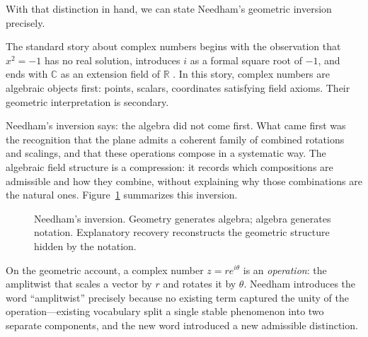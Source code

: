 \documentclass[12pt]{article}
\begin{document}
With that distinction in hand, we can state Needham's geometric inversion precisely.

The standard story about complex numbers begins with the observation that $x^2 = -1$ has no real solution, introduces $i$ as a formal square root of $-1$, and ends with $\mathbb{C}$ as an extension field of $\mathbb{R}$ \cite{Gauss,Argand,Wessel}. In this story, complex numbers are algebraic objects first: points, scalars, coordinates satisfying field axioms. Their geometric interpretation is secondary.

Needham's inversion says: the algebra did not come first. What came first was the recognition that the plane admits a coherent family of combined rotations and scalings, and that these operations compose in a systematic way. The algebraic field structure is a compression: it records which compositions are admissible and how they combine, without explaining why those combinations are the natural ones. Figure~\ref{fig:needham-inversion} summarizes this inversion.

\begin{figure}[ht]
\centering
{}
\caption{Needham's inversion. Geometry generates algebra; algebra generates
notation. Explanatory recovery reconstructs the geometric structure hidden by
the notation.}
\label{fig:needham-inversion}
\end{figure}

On the geometric account, a complex number $z = re^{i\theta}$ is an \emph{operation}: the amplitwist that scales a vector by $r$ and rotates it by $\theta$. Needham introduces the word ``amplitwist'' precisely because no existing term captured the unity of the operation---existing vocabulary split a single stable phenomenon into two separate components, and the new word introduced a new admissible distinction.
\end{document}
